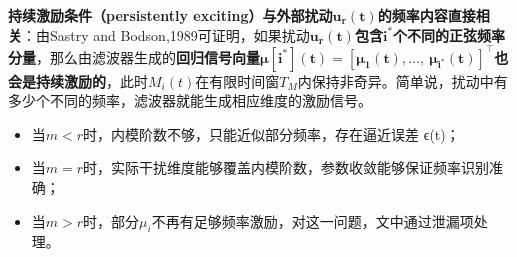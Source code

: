 \documentclass[
  12pt,
  a4paper
]{article}
\begin{document}
\textbf{持续激励条件（persistently
exciting）与外部扰动}\(\mathbf{u}_{\mathbf{r}}\left( \mathbf{t} \right)\)\textbf{的频率内容直接相关}：由Sastry
and
Bodson,1989可证明，如果扰动\(\mathbf{u}_{\mathbf{r}}\left( \mathbf{t} \right)\)\textbf{包含}\(\mathbf{i}^{\mathbf{*}}\)\textbf{个不同的正弦频率分量}，那么由滤波器生成的\textbf{回归信号向量}\(\mathbf{\mu}\left\lbrack \mathbf{i}^{\mathbf{*}} \right\rbrack\left( \mathbf{t} \right)\mathbf{=}\left\lbrack \mathbf{\mu}_{\mathbf{1}}\left( \mathbf{t} \right)\mathbf{,\ldots,\ }\mathbf{\mu}_{\mathbf{i}^{\mathbf{*}}}\left( \mathbf{t} \right) \right\rbrack^{\mathbf{\top}}\)\textbf{也会是持续激励的}，此时\(M_{i}(t)\)在有限时间窗\(T_{M}\)内保持非奇异。简单说，扰动中有多少个不同的频率，滤波器就能生成相应维度的激励信号。

\begin{itemize}
\item
  当\(m < r\)时，内模阶数不够，只能近似部分频率，存在逼近误差 ϵ(t)；
\item
  当\(m = r\)时，实际干扰维度能够覆盖内模阶数，参数收敛能够保证频率识别准确；
\item
  当\(m > r\)时，部分\(\mu_{i}\)不再有足够频率激励，对这一问题，文中通过泄漏项处理。
\end{itemize}
\end{document}
